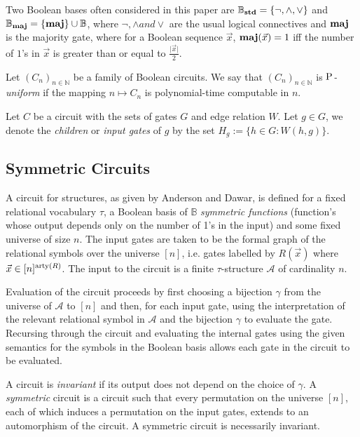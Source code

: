 \documentclass[../paper.tex]{subfiles}
\begin{document}
Two Boolean bases often considered in this paper are $\mathbb{B}_{\text{\textbf{std}}} = \{
\neg , \wedge , \lor \}$ and $\mathbb{B}_{\text{\textbf{maj}}} = \{ \text{\textbf{maj}} \} \cup \mathbb{B}$,
where $\neg, \wedge and \lor$ are the usual logical connectives and $\text{\textbf{maj}}$ is
the majority gate, where for a Boolean sequence $\vec{x}$, $\text{\textbf{maj}}(\vec{x}) = 1$
iff the number of $1$'s in $\vec{x}$ is greater than or equal to
$\frac{\vert\vec{x}\vert}{2}$.


\begin{definition}
  Let $(C_n)_{n \in \mathbb{N}}$ be a family of Boolean circuits. We say that
  $(C_n)_{n \in \mathbb{N}}$ is \emph{$\mathrm{P}$-uniform} if the mapping $n \mapsto
  C_n$ is polynomial-time computable in $n$.
\end{definition}

Let $C$ be a circuit with the sets of gates $G$ and edge relation $W$. Let $g
\in G$, we denote the \emph{children} or \emph{input gates} of $g$ by the set
$H_g := \{h \in G : W(h,g)\}$.

\subsection{Symmetric Circuits}
A circuit for structures, as given by Anderson and Dawar, is defined for a fixed
relational vocabulary $\tau$, a Boolean basis of $\mathbb{B}$ \emph{symmetric
  functions} (function's whose output depends only on the number of 1's in the
input) and some fixed universe of size $n$. The input gates are taken to be the
formal graph of the relational symbols over the universe $[n]$, i.e. gates
labelled by $R(\vec{x})$ where $\vec{x} \in [n]^{\mathrm{arty}(R)}$. The input to the
circuit is a finite $\tau$-structure $\mathcal{A}$ of cardinality $n$.

Evaluation of the circuit proceeds by first choosing a bijection $\gamma$ from
the universe of $\mathcal{A}$ to $[n]$ and then, for each input gate, using the
interpretation of the relevant relational symbol in $\mathcal{A}$ and the
bijection $\gamma$ to evaluate the gate. Recursing through the circuit and
evaluating the internal gates using the given semantics for the symbols in the
Boolean basis allows each gate in the circuit to be evaluated.

A circuit is \emph{invariant} if its output does not depend on the choice of
$\gamma$. A \emph{symmetric} circuit is a circuit such that every permutation on
the universe $[n]$, each of which induces a permutation on the input gates,
extends to an automorphism of the circuit. A symmetric circuit is necessarily
invariant.
\end{document}
